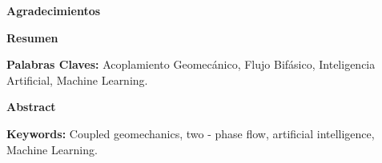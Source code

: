 \newpage
\thispagestyle{empty} 
\vspace*{4.0cm}
\textbf{\huge Agradecimientos}
\vspace*{1.0cm}

\lipsum[1-2]

\newpage{\pagestyle{empty}\cleardoublepage}


\newpage
\vspace*{4cm}
\textbf{\huge Resumen}
{}
\vspace*{1cm}

\lipsum[1-2]

\vspace{1.0cm}

\textbf{\small Palabras Claves:} Acoplamiento Geomecánico, Flujo Bifásico, Inteligencia Artificial, Machine Learning.

\newpage{\pagestyle{empty}\cleardoublepage}


\newpage
\vspace*{4cm}
\textbf{\huge Abstract}
{}
\vspace*{1cm}

\lipsum[1-2]

\vspace{1.0cm}

\textbf{\small Keywords:} Coupled geomechanics, two - phase flow, artificial intelligence, Machine Learning.

\newpage{\pagestyle{empty}\cleardoublepage}
